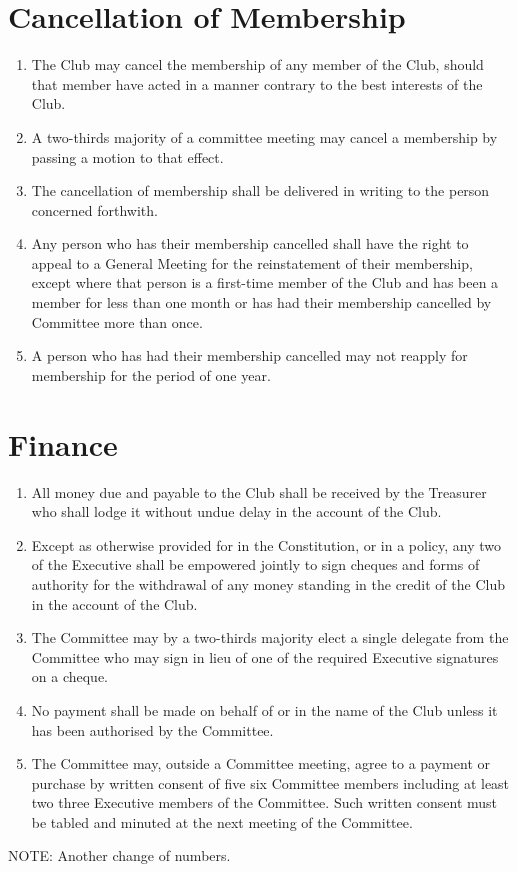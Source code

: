 \documentclass[11pt]{article} %
\begin{document}
\section{Cancellation of Membership}
\begin{enumerate}
\item The Club may cancel the membership of any member of the Club, should that member have acted in a manner contrary to the best interests of the Club.
\item A two-thirds majority of a committee meeting may cancel a membership by passing a motion to that effect.
\item The cancellation of membership shall be delivered in writing to the person concerned forthwith.
\item Any person who has their membership cancelled shall have the right to appeal to a General Meeting for the reinstatement of their membership, except where that person is a first-time member of the Club and has been a member for less than one month or has had their membership cancelled by Committee more than once.
\item A person who has had their membership cancelled may not reapply for membership for the period of one year.
\end{enumerate}

\section{Finance}
\begin{enumerate}
	\item All money due and payable to the Club shall be received by the Treasurer who shall lodge it without undue delay in the account of the Club.
	\item Except as otherwise provided for in the Constitution, or in a policy, any two of the Executive shall be empowered jointly to sign cheques and forms of authority for the withdrawal of any money standing in the credit of the Club in the account of the Club.
	\item The Committee may by a two-thirds majority elect a single delegate from the Committee who may sign in lieu of one of the required Executive signatures on a cheque.
	\item No payment shall be made on behalf of or in the name of the Club unless it has been authorised by the Committee.
	\item The Committee may, outside a Committee meeting, agree to a payment or purchase by written consent of {\color{red}five} {\color{ForestGreen}six} Committee members including at least {\color{red}two} {\color{ForestGreen}three} Executive members of the Committee. Such written consent must be tabled and minuted at the next meeting of the Committee.
\end{enumerate}
{\color{Cyan}NOTE:
Another change of numbers.
}
\end{document}
